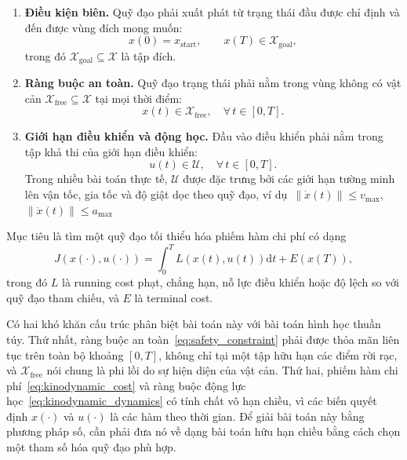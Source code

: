 \begin{enumerate}
    \item \textbf{Điều kiện biên.}
          Quỹ đạo phải xuất phát từ trạng thái đầu được chỉ định và đến được vùng đích mong muốn:
          \begin{equation}
              x(0) = x_{\mathrm{start}}, \qquad x(T) \in \mathcal{X}_{\mathrm{goal}},
              \label{eq:boundary_conditions}
          \end{equation}
          trong đó $\mathcal{X}_{\mathrm{goal}} \subseteq \mathcal{X}$ là tập đích.

    \item \textbf{Ràng buộc an toàn.}
          Quỹ đạo trạng thái phải nằm trong vùng không có vật cản
          $\mathcal{X}_{\mathrm{free}} \subseteq \mathcal{X}$ tại mọi thời điểm:
          \begin{equation}
              x(t) \in \mathcal{X}_{\mathrm{free}}, \quad \forall\, t \in [0, T].
              \label{eq:safety_constraint}
          \end{equation}

    \item \textbf{Giới hạn điều khiển và động học.}
          Đầu vào điều khiển phải nằm trong tập khả thi của giới hạn điều khiển:
          \begin{equation}
              u(t) \in \mathcal{U}, \quad \forall\, t \in [0, T].
              \label{eq:control_constraint}
          \end{equation}
          Trong nhiều bài toán thực tế, $\mathcal{U}$ được đặc trưng bởi các giới hạn tường minh
          lên vận tốc, gia tốc và độ giật dọc theo quỹ đạo,
          ví dụ\ $\|\dot{x}(t)\| \le v_{\max}$, $\|\ddot{x}(t)\| \le a_{\max}$
\end{enumerate}

Mục tiêu là tìm một quỹ đạo tối thiểu hóa phiếm hàm chi phí có dạng
\begin{equation}
    J\!\left(x(\cdot), u(\cdot)\right)
    = \int_{0}^{T} L\!\left(x(t), u(t)\right) \mathrm{d}t + E\!\left(x(T)\right),
    \label{eq:kinodynamic_cost}
\end{equation}
trong đó $L$ là running cost phạt, chẳng hạn, nỗ lực điều khiển hoặc độ lệch so với
quỹ đạo tham chiếu, và $E$ là terminal cost.

Có hai khó khăn cấu trúc phân biệt bài toán này với bài toán hình học thuần túy.
Thứ nhất, ràng buộc an toàn~\eqref{eq:safety_constraint} phải được thỏa mãn liên tục
trên toàn bộ khoảng $[0, T]$, không chỉ tại một tập hữu hạn các điểm rời rạc,
và $\mathcal{X}_{\mathrm{free}}$ nói chung là phi lồi do sự hiện diện của vật cản.
Thứ hai, phiếm hàm chi phí~\eqref{eq:kinodynamic_cost} và ràng buộc động lực
học~\eqref{eq:kinodynamic_dynamics} có tính chất vô hạn chiều, vì các biến quyết định
$x(\cdot)$ và $u(\cdot)$ là các hàm theo thời gian.
Để giải bài toán này bằng phương pháp số, cần phải đưa nó về dạng bài toán hữu hạn chiều
bằng cách chọn một tham số hóa quỹ đạo phù hợp.

